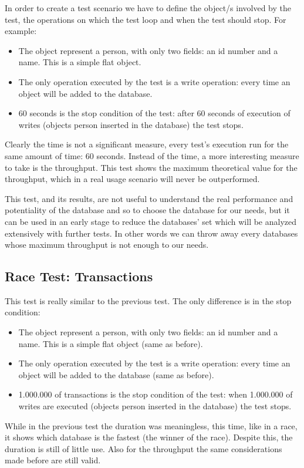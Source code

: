 In order to create a test scenario we have to define the object/s involved by the test, the operations on which the test loop and when the test should stop. For example:
\begin{itemize}
	\item The object represent a person, with only two fields: an id number and a name. This is a simple flat object. 
	\item The only operation executed by the test is a write operation: every time an object will be added to the database.
	\item 60 seconds is the stop condition of the test: after 60 seconds of execution of writes (objects person inserted in the database) the test stops.
\end{itemize}
Clearly the time is not a significant measure, every test's execution run for the same amount of time: 60 seconds. Instead of the time, a more interesting measure to take is the throughput. This test shows the maximum theoretical value for the throughput, which in a real usage scenario will never be outperformed. 

This test, and its results, are not useful to understand the real performance and potentiality of the database and so to choose the database for our needs, but it can be used in an early stage to reduce the databases' set which will be analyzed extensively with further tests. In other words we can throw away every databases whose maximum throughput is not enough to our needs.

		\subsection{Race Test: Transactions}
This test is really similar to the previous test. The only difference is in the stop condition:
\begin{itemize}
	\item The object represent a person, with only two fields: an id number and a name. This is a simple flat object (same as before). 
	\item The only operation executed by the test is a write operation: every time an object will be added to the database (same as before).
	\item 1.000.000 of transactions is the stop condition of the test: when 1.000.000 of writes are executed (objects person inserted in the database) the test stops.
\end{itemize}
While in the previous test the duration was meaningless, this time, like in a race, it shows which database is the fastest (the winner of the race). Despite this, the duration is still of little use. Also for the throughput the same considerations made before are still valid.

